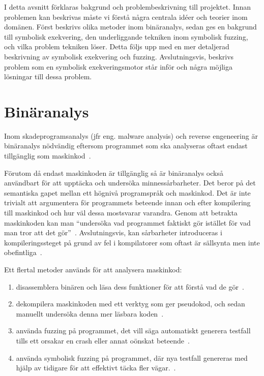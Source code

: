 I detta avsnitt förklaras bakgrund och problembeskrivning till projektet. Innan
problemen kan beskrivas måste vi förstå några centrala idéer och teorier inom
domänen. Först beskrivs olika metoder inom binäranalys, sedan ges en bakgrund
till symbolisk exekvering, den underliggande tekniken inom symbolisk fuzzing, och vilka
problem tekniken löser. Detta följs upp med en mer detaljerad beskrivning av symbolisk
exekvering och fuzzing. Avslutningsvis, beskrivs problem som en symbolisk exekveringsmotor
står inför och några möjliga lösningar till dessa problem.

\section{Binäranalys}
\label{sec:binar_analys}
Inom skadeprogramsanalys (jfr eng. malware analysis) och reverse engeneering
är binäranalys nödvändig eftersom programmet som ska analyseras oftast endast
tillgänglig som maskinkod~\cite{andriesse2018}.

Förutom då endast maskinkoden är tillgänglig så är binäranalys också användbart för att
upptäcka och undersöka minnessårbarheter. Det beror på det semantiska gapet mellan ett
högnivå programspråk och maskinkod. Det är inte trivialt att argumentera för programmets
beteende innan och efter kompilering
till maskinkod och hur väl dessa mostsvarar varandra. Genom att betrakta
maskinkoden kan man ``undersöka vad programmet faktiskt gör istället för vad
man tror att det gör''~\cite{andriesse2018}. Avslutningsvis, kan sårbarheter
introduceras i kompileringssteget på grund av fel i kompilatorer som oftast är
sällsynta men inte obefintliga~\cite{silentbugsmatter}.

Ett flertal metoder används för att analysera maskinkod:
\begin{enumerate}
    \item disassemblera binären och läsa dess funktioner för att förstå vad de gör~\cite{ghidra_website}.
    \item dekompilera maskinkoden med ett verktyg som ger pseudokod, och sedan manuellt undersöka denna mer läsbara koden~\cite{ghidra_website}.
    \item använda fuzzing på programmet, det vill säga automatiskt generera testfall tills ett orsakar en crash eller
          annat oönskat beteende~\cite{8371326}.
    \item använda symbolisk fuzzing på programmet, där nya testfall genereras med hjälp av tidigare för att effektivt täcka fler vägar.~\cite{sage}.
\end{enumerate}

